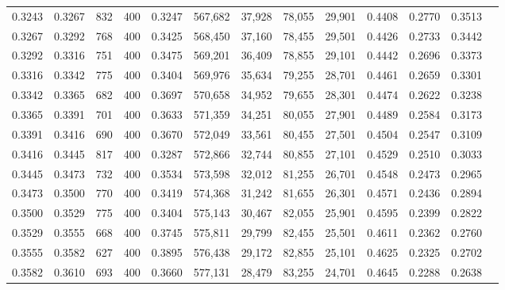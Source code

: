 \begin{tabular}{rrrrrrrrrrrrr}
0.3243 & 0.3267 &    832 & 400 &                                     0.3247 & 567,682 &  37,928 &  78,055 &  29,901 & 0.4408 & 0.2770 & 0.3513 \\
0.3267 & 0.3292 &    768 & 400 &                                     0.3425 & 568,450 &  37,160 &  78,455 &  29,501 & 0.4426 & 0.2733 & 0.3442 \\
0.3292 & 0.3316 &    751 & 400 &                                     0.3475 & 569,201 &  36,409 &  78,855 &  29,101 & 0.4442 & 0.2696 & 0.3373 \\
0.3316 & 0.3342 &    775 & 400 &                                     0.3404 & 569,976 &  35,634 &  79,255 &  28,701 & 0.4461 & 0.2659 & 0.3301 \\
0.3342 & 0.3365 &    682 & 400 &                                     0.3697 & 570,658 &  34,952 &  79,655 &  28,301 & 0.4474 & 0.2622 & 0.3238 \\
0.3365 & 0.3391 &    701 & 400 &                                     0.3633 & 571,359 &  34,251 &  80,055 &  27,901 & 0.4489 & 0.2584 & 0.3173 \\
0.3391 & 0.3416 &    690 & 400 &                                     0.3670 & 572,049 &  33,561 &  80,455 &  27,501 & 0.4504 & 0.2547 & 0.3109 \\
0.3416 & 0.3445 &    817 & 400 &                                     0.3287 & 572,866 &  32,744 &  80,855 &  27,101 & 0.4529 & 0.2510 & 0.3033 \\
0.3445 & 0.3473 &    732 & 400 &                                     0.3534 & 573,598 &  32,012 &  81,255 &  26,701 & 0.4548 & 0.2473 & 0.2965 \\
0.3473 & 0.3500 &    770 & 400 &                                     0.3419 & 574,368 &  31,242 &  81,655 &  26,301 & 0.4571 & 0.2436 & 0.2894 \\
0.3500 & 0.3529 &    775 & 400 &                                     0.3404 & 575,143 &  30,467 &  82,055 &  25,901 & 0.4595 & 0.2399 & 0.2822 \\
0.3529 & 0.3555 &    668 & 400 &                                     0.3745 & 575,811 &  29,799 &  82,455 &  25,501 & 0.4611 & 0.2362 & 0.2760 \\
0.3555 & 0.3582 &    627 & 400 &                                     0.3895 & 576,438 &  29,172 &  82,855 &  25,101 & 0.4625 & 0.2325 & 0.2702 \\
0.3582 & 0.3610 &    693 & 400 &                                     0.3660 & 577,131 &  28,479 &  83,255 &  24,701 & 0.4645 & 0.2288 & 0.2638 \\

\end{tabular}
